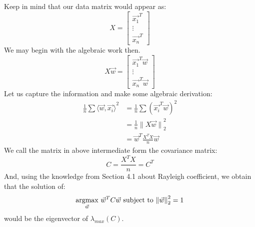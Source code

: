 Keep in mind that our data matrix would appear as:
\[
    X = \begin{bmatrix} \vec{x_1}^T \\ \vdots \\ \vec{x_n}^T \end{bmatrix}
\]
We may begin with the algebraic work then.
\[
    X \vec{w} = \begin{bmatrix} \vec{x_1}^T \vec{w} \\ \vdots \\ \vec{x_n}^T \vec{w} \end{bmatrix}
\]
Let us capture the information and make some algebraic derivation:
\begin{align*}
    \frac{1}{n} \sum {\langle \vec{w}, \vec{x_i} \rangle}^2
    &= \frac{1}{n} \sum {(\vec{x_i}^T \vec{w})}^2 \\
    &= \frac{1}{n} {\lVert X \vec{w} \rVert}_2^2 \\
    &= \vec{w}^T \frac{X^T X}{n} \vec{w}
\end{align*}
We call the matrix in above intermediate form the covariance matrix:
\[
    C = \frac{X^T X}{n} = C^T
\]
And, using the knowledge from Section 4.1 about Rayleigh coefficient, we obtain that the solution of:
\[
    \underset{\vec{w}}{\rm argmax} \ \vec{w}^T C \vec{w} \text{ subject to } {\lVert \vec{w} \rVert}_2^2 = 1
\]
would be the eigenvector of $\lambda_{max}(C)$.
